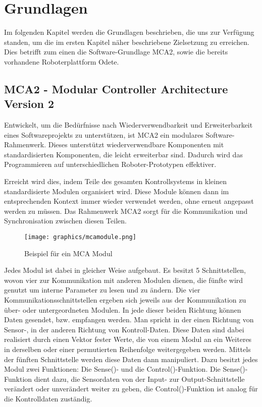 \chapter{Grundlagen}
\label{grundlagen_cha}

Im folgenden Kapitel werden die Grundlagen beschrieben, die uns zur Verfügung standen,
 um die im ersten Kapitel näher beschriebene Zielsetzung zu erreichen. Dies betrifft zum einen die
 Software-Grundlage MCA2, sowie die bereits vorhandene Roboterplattform Odete.

\section{MCA2 - Modular Controller Architecture Version 2}
\authorsection{\editoranne}

Entwickelt, um die Bedürfnisse nach Wiederverwendbarkeit und Erweiterbarkeit eines Softwareprojekts zu unterstützen,
 ist MCA2 ein modulares Software-Rahmenwerk. Dieses unterstützt wiederverwendbare Komponenten mit standardisierten Komponenten,
 die leicht erweiterbar sind. Dadurch wird das Programmieren auf unterschiedlichen Roboter-Prototypen effektiver.

Erreicht wird dies, indem Teile des gesamten Kontrollsystems in kleinen standardisierte Modulen organisiert wird.
 Diese Module können dann im entsprechenden Kontext immer wieder verwendet werden, ohne erneut angepasst werden zu müssen.
 Das Rahmenwerk MCA2 sorgt für die Kommunikation und Synchronisation zwischen diesen Teilen.

\begin{figure}[h]
	\center
	\texttt{[image: graphics/mcamodule.png]}
	\caption{\label{fig:MCA-Modul} Beispiel für ein MCA Modul}
\end{figure}

Jedes Modul ist dabei in gleicher Weise aufgebaut. Es besitzt 5 Schnittstellen, wovon vier zur Kommunikation mit anderen Modulen dienen,
 die fünfte wird genutzt um interne Parameter zu lesen und zu ändern. Die vier Kommunikationsschnittstellen ergeben sich jeweils aus der
 Kommunikation zu über- oder untergeordneten Modulen. In jede dieser beiden Richtung können Daten gesendet, bzw. empfangen werden.
 Man spricht in der einen Richtung von Sensor-, in der anderen Richtung von Kontroll-Daten. Diese Daten sind dabei realisiert durch einen Vektor fester Werte,
 die von einem Modul an ein Weiteres in derselben oder einer permutierten Reihenfolge weitergegeben werden.
 Mittels der fünften Schnittstelle werden diese Daten dann manipuliert. Dazu besitzt jedes Modul zwei Funktionen: Die Sense()- und die Control()-Funktion.
 Die Sense()-Funktion dient dazu, die Sensordaten von der Input- zur Output-Schnittstelle verändert oder unverändert weiter zu geben, die Control()-Funktion ist
 analog für die Kontrolldaten zuständig.

